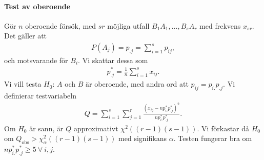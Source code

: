 \paragraph{Test av oberoende}
Gör $n$ oberoende försök, med $sr$ möjliga utfall $B_1A_1, \dots, B_sA_r$ med frekvens $x_{sr}$. Det gäller att
\begin{align*}
	P(A_j) = p_{.j} = \sum\limits_{i = 1}^{s}p_{ij},
\end{align*}
och motsvarande för $B_i$. Vi skattar dessa som
\begin{align*}
	p_{.j}^* = \frac{1}{n}\sum\limits_{i = 1}^{s}x_{ij}.
\end{align*}
Vi vill testa $H_0$: $A$ och $B$ är oberoende, med andra ord att $p_{ij} = p_{i.}p_{.j}$. Vi definierar testvariabeln
\begin{align*}
	Q = \sum\limits_{i = 1}^{s}\sum\limits_{j = 1}^{r}\frac{(x_{ij} - np_{i.}^*p_{.j}^*)^2}{np_{i.}^*p_{.j}^*}.
\end{align*}
Om $H_0$ är sann, är $Q$ approximativt $\chi^2((r - 1)(s - 1))$. Vi förkastar då $H_0$ om $Q_{\text{obs}} > \chi_{\alpha}^2((r - 1)(s - 1))$ med signifikans $\alpha$. Testen fungerar bra om $np_{i.}^*p_{.j}^*\geq 5\ \forall\ i, j$.